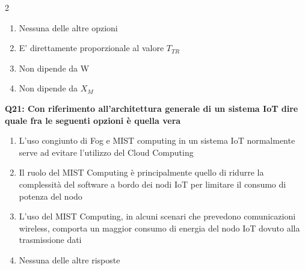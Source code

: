 \documentclass[10pt]{article}
\begin{document}
\begin{multicols}{2}
\begin{enumerate}[label=\arabic*.]
\item Nessuna delle altre opzioni
\item E' direttamente proporzionale al valore $T_{TR}$
\item Non dipende da W
\item Non dipende da $X_M$
\end{enumerate}
\textbf{Q21: Con riferimento all’architettura generale di un sistema IoT dire quale fra le seguenti opzioni è quella vera}

\begin{enumerate}[label=\arabic*.]
\item L’uso congiunto di Fog e MIST computing in un sistema IoT normalmente serve ad evitare l’utilizzo del Cloud Computing
\item Il ruolo del MIST Computing è principalmente quello di ridurre la complessità del software a bordo dei nodi IoT per limitare il consumo di potenza del nodo
\item L’uso del MIST Computing, in alcuni scenari che prevedono comunicazioni wireless, comporta un maggior consumo di energia del nodo IoT dovuto alla trasmissione dati
\item Nessuna delle altre risposte
\end{enumerate}
\end{multicols}

\newpage
\end{document}
